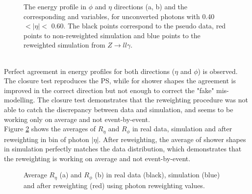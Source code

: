 \begin{figure}[htbp]
	\begin{tcolorbox}[colback=black!5!white,colframe=white!75!black]
    \caption{The energy profile in $\phi$ and $\eta$ directions (a, b) and the corresponding \Rphi and \Reta variables, for unconverted photons with 0.40 $ < |\eta| < $ 0.60. The black points correspond to the pseudo data, red points to non-reweighted simulation and blue points to the reweighted simulation from $Z\rightarrow ll\gamma$.}
    \label{fig:gamma:ss:reweighting:photon:closure}
    \end{tcolorbox}
    
\end{figure}
\\
Perfect agreement in energy profiles for both directions ($\eta$ and $\phi$) is observed. The closure test reproduces the PS, while for shower shapes the agreement is improved in the correct direction but not enough to correct the "fake" mis-modelling. The closure test demonstrates that the reweighting procedure was not able to catch the discrepancy between data and simulation, and seems to be working only on average and not event-by-event. \\
Figure \ref{fig:gamma:ss:reweighting:photon:closure:avg} shows the averages of $R_{\eta}$ and $R_{\phi}$ in real data, simulation and after reweighting in bin of photon $|\eta|$. After reweighting, the average of shower shapes in simulation perfectly matches the data distribution, which demonstrates that the reweighting is working on average and not event-by-event.

\begin{figure}[htbp]
    \centering
    \begin{tcolorbox}[colback=black!5!white,colframe=white!75!black]
    \caption{Average $R_{\eta}$ (a) and $R_{\phi}$ (b) in real data (black), simulation (blue) and after reweighting (red) using photon reweighting values.}
    \label{fig:gamma:ss:reweighting:photon:closure:avg}
    \end{tcolorbox}
\end{figure}

